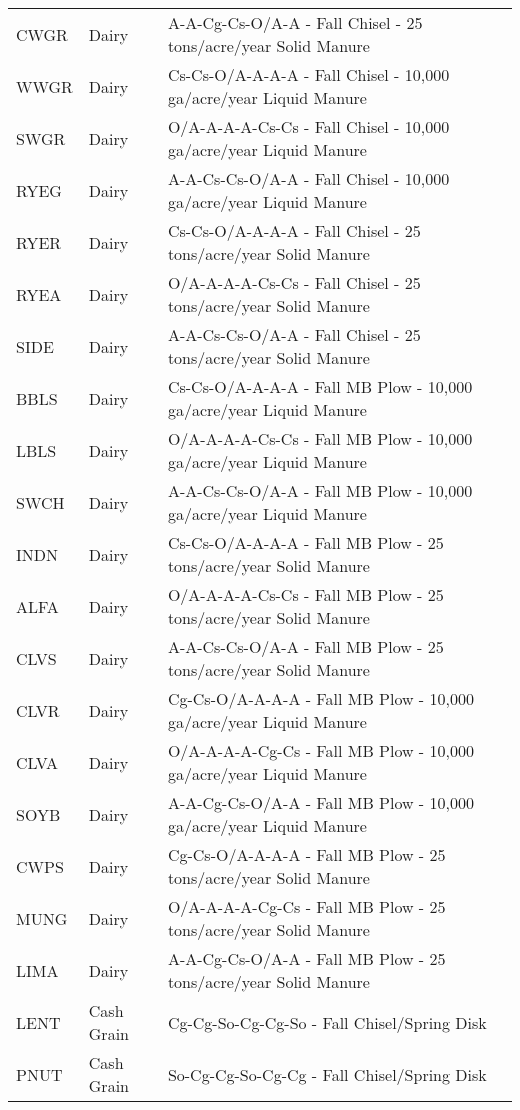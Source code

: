 \begin{landscape}
\begin{longtable}{lll}
  CWGR & Dairy & A-A-Cg-Cs-O/A-A - Fall Chisel - 25 tons/acre/year Solid Manure  \\ 
  WWGR & Dairy & Cs-Cs-O/A-A-A-A - Fall Chisel - 10,000 ga/acre/year Liquid Manure  \\ 
  SWGR & Dairy & O/A-A-A-A-Cs-Cs - Fall Chisel - 10,000 ga/acre/year Liquid Manure  \\ 
  RYEG & Dairy & A-A-Cs-Cs-O/A-A - Fall Chisel - 10,000 ga/acre/year Liquid Manure  \\ 
  RYER & Dairy & Cs-Cs-O/A-A-A-A - Fall Chisel - 25 tons/acre/year Solid Manure  \\ 
  RYEA & Dairy & O/A-A-A-A-Cs-Cs - Fall Chisel - 25 tons/acre/year Solid Manure  \\ 
  SIDE & Dairy & A-A-Cs-Cs-O/A-A - Fall Chisel - 25 tons/acre/year Solid Manure  \\ 
  BBLS & Dairy & Cs-Cs-O/A-A-A-A - Fall MB Plow - 10,000 ga/acre/year Liquid Manure  \\ 
  LBLS & Dairy & O/A-A-A-A-Cs-Cs - Fall MB Plow - 10,000 ga/acre/year Liquid Manure  \\ 
  SWCH & Dairy & A-A-Cs-Cs-O/A-A - Fall MB Plow - 10,000 ga/acre/year Liquid Manure  \\ 
  INDN & Dairy & Cs-Cs-O/A-A-A-A - Fall MB Plow - 25 tons/acre/year Solid Manure  \\ 
  ALFA & Dairy & O/A-A-A-A-Cs-Cs - Fall MB Plow - 25 tons/acre/year Solid Manure  \\ 
  CLVS & Dairy & A-A-Cs-Cs-O/A-A - Fall MB Plow - 25 tons/acre/year Solid Manure  \\ 
  CLVR & Dairy & Cg-Cs-O/A-A-A-A - Fall MB Plow - 10,000 ga/acre/year Liquid Manure  \\ 
  CLVA & Dairy & O/A-A-A-A-Cg-Cs - Fall MB Plow - 10,000 ga/acre/year Liquid Manure  \\ 
  SOYB & Dairy & A-A-Cg-Cs-O/A-A - Fall MB Plow - 10,000 ga/acre/year Liquid Manure  \\ 
  CWPS & Dairy & Cg-Cs-O/A-A-A-A - Fall MB Plow - 25 tons/acre/year Solid Manure  \\ 
  MUNG & Dairy & O/A-A-A-A-Cg-Cs - Fall MB Plow - 25 tons/acre/year Solid Manure  \\ 
  LIMA & Dairy & A-A-Cg-Cs-O/A-A - Fall MB Plow - 25 tons/acre/year Solid Manure  \\ 
  LENT & Cash Grain & Cg-Cg-So-Cg-Cg-So - Fall Chisel/Spring Disk  \\ 
  PNUT & Cash Grain & So-Cg-Cg-So-Cg-Cg - Fall Chisel/Spring Disk  \\ 

\end{longtable}
\end{landscape}
